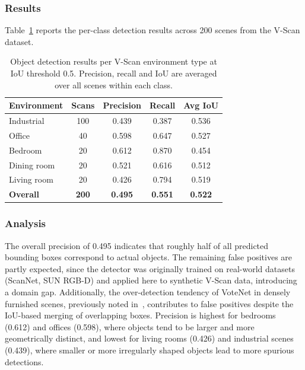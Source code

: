 \subsubsection{Results}

Table~\ref{tab:5_detection_results} reports the per-class detection results across 200 scenes from the V-Scan dataset.
\begin{table}[h]
    \centering
    \caption[Object detection results per environment type]{Object detection results per V-Scan environment type at IoU threshold 0.5. Precision, recall and IoU are averaged over all scenes within each class.}
    \label{tab:5_detection_results}
    \begin{tabular}{l c c c c}
        \toprule
        \textbf{Environment} & \textbf{Scans} & \textbf{Precision} & \textbf{Recall} & \textbf{Avg IoU} \\
        \midrule
        Industrial   & 100 & 0.439 & 0.387 & 0.536 \\
        Office       &  40 & 0.598 & 0.647 & 0.527 \\
        Bedroom      &  20 & 0.612 & 0.870 & 0.454 \\
        Dining room  &  20 & 0.521 & 0.616 & 0.512 \\
        Living room  &  20 & 0.426 & 0.794 & 0.519 \\
        \midrule
        \textbf{Overall} & \textbf{200} & \textbf{0.495} & \textbf{0.551} & \textbf{0.522} \\
        \bottomrule
    \end{tabular}
\end{table}

\subsubsection{Analysis}

The overall precision of 0.495 indicates that roughly half of all predicted bounding boxes correspond to actual objects. The remaining false positives are partly expected, since the detector was originally trained on real-world datasets (ScanNet, SUN RGB-D) and applied here to synthetic V-Scan data, introducing a domain gap. Additionally, the over-detection tendency of VoteNet in densely furnished scenes, previously noted in~\cite{vermandere_guided_2025}, contributes to false positives despite the IoU-based merging of overlapping boxes. Precision is highest for bedrooms (0.612) and offices (0.598), where objects tend to be larger and more geometrically distinct, and lowest for living rooms (0.426) and industrial scenes (0.439), where smaller or more irregularly shaped objects lead to more spurious detections.

